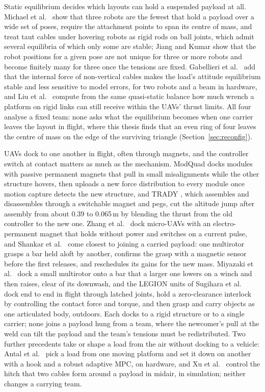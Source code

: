 Static equilibrium decides which layouts can hold a suspended payload at all. Michael et al.\
\cite{michael2011cooperative} show that three robots are the fewest that hold a payload over a wide set of
poses, require the attachment points to span its centre of mass, and treat taut cables under hovering
robots as rigid rods on ball joints, which admit several equilibria of which only some are stable; Jiang
and Kumar \cite{jiang2013inverse} show that the robot positions for a given pose are not unique for three
or more robots and become finitely many for three once the tensions are fixed. Gabellieri et al.\
\cite{gabellieri2023equilibria} add that the internal force of non-vertical cables makes the load's
attitude equilibrium stable and less sensitive to model errors, for two robots and a beam in hardware, and
Liu et al.\ \cite{liu2025wrench} compute from the same quasi-static balance how much wrench a platform on
rigid links can still receive within the UAVs' thrust limits. All four analyse a fixed team: none asks what
the equilibrium becomes when one carrier leaves the layout in flight, where this thesis finds that an even
ring of four leaves the centre of mass on the edge of the surviving triangle (Section~\ref{sec:reconfig}).

UAVs dock to one another in flight, often through magnets, and the controller switch at contact matters as
much as the mechanism. ModQuad \cite{saldana2018modquad} docks modules with passive permanent magnets that
pull in small misalignments while the other structure hovers, then uploads a new force distribution to every
module once motion capture detects the new structure, and TRADY \cite{sugihara2023trady}, which assembles and
disassembles through a switchable magnet and pegs, cut the altitude jump after assembly from about 0.39 to
0.065\,m by blending the thrust from the old controller to the new one. Zhang et al.\ \cite{zhang2026epm}
dock micro-UAVs with an electro-permanent magnet that holds without power and switches on a current pulse,
and Shankar et al.\ \cite{shankar2020inflight} come closest to joining a carried payload: one multirotor
grasps a bar held aloft by another, confirms the grasp with a magnetic sensor before the first releases, and
reschedules its gains for the new mass. Miyazaki et al.\ \cite{miyazaki2018airborne} dock a small multirotor onto a bar that a larger one lowers on a winch and then raises, clear of its downwash, and the LEGION units of Sugihara et al.\ \cite{sugihara2026legion} dock end to end in flight through latched joints, hold a zero-clearance interlock by controlling the contact force and torque, and then grasp and carry objects as one articulated body, outdoors. Each docks to a rigid structure or to a single carrier; none joins
a payload hung from a team, where the newcomer's pull at the weld can tilt the payload and the team's
tensions must be redistributed. Two further precedents take or shape a load from the air without docking to a vehicle: Antal et al.\ \cite{antal2026hook} pick a load from one moving platform and set it down on another with a hook and a robust adaptive MPC, on hardware, and Xu et al.\ \cite{xu2026hitches} control the hitch that two cables form around a payload in midair, in simulation; neither changes a carrying team.

